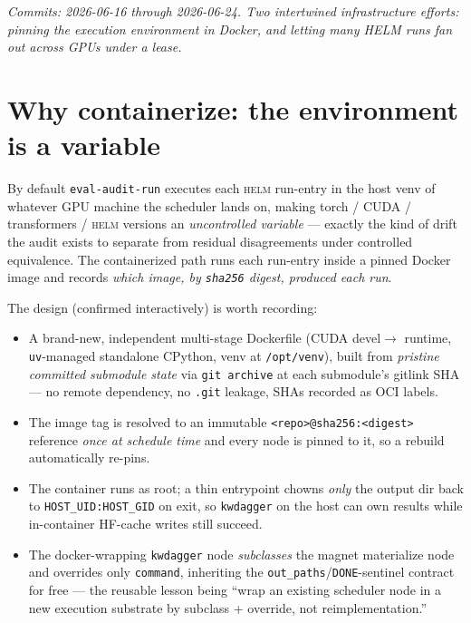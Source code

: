 \documentclass[11pt]{report}
\newcommand{\code}[1]{\texttt{#1}}
\begin{document}
\emph{Commits: 2026-06-16 through 2026-06-24. Two intertwined infrastructure
efforts: pinning the execution environment in Docker, and letting many HELM runs
fan out across GPUs under a lease.}

\section{Why containerize: the environment is a variable}

By default \code{eval-audit-run} executes each \textsc{helm} run-entry in the host
venv of whatever GPU machine the scheduler lands on, making torch / CUDA /
transformers / \textsc{helm} versions an \emph{uncontrolled variable} --- exactly
the kind of drift the audit exists to separate from residual disagreements under controlled equivalence.
The containerized path runs each run-entry inside a pinned Docker image and records
\emph{which image, by \code{sha256} digest, produced each run}.

The design (confirmed interactively) is worth recording:

\begin{itemize}[nosep]
  \item A brand-new, independent multi-stage Dockerfile (CUDA devel$\rightarrow$
        runtime, \code{uv}-managed standalone CPython, venv at \code{/opt/venv}),
        built from \emph{pristine committed submodule state} via \code{git archive}
        at each submodule's gitlink SHA --- no remote dependency, no \code{.git}
        leakage, SHAs recorded as OCI labels.
  \item The image tag is resolved to an immutable \code{<repo>@sha256:<digest>}
        reference \emph{once at schedule time} and every node is pinned to it, so a
        rebuild automatically re-pins.
  \item The container runs as root; a thin entrypoint chowns \emph{only} the output
        dir back to \code{HOST\_UID:HOST\_GID} on exit, so \code{kwdagger} on the
        host can own results while in-container HF-cache writes still succeed.
  \item The docker-wrapping \code{kwdagger} node \emph{subclasses} the magnet
        materialize node and overrides only \code{command}, inheriting the
        \code{out\_paths}/\code{DONE}-sentinel contract for free --- the reusable
        lesson being ``wrap an existing scheduler node in a new execution substrate
        by subclass + override, not reimplementation.''
\end{itemize}
\end{document}

